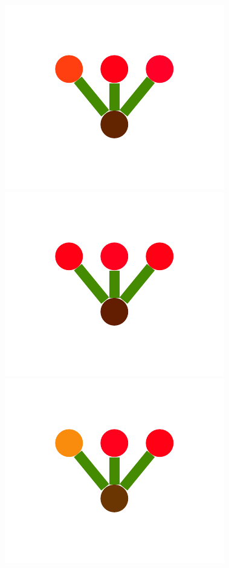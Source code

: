 \documentclass[a4paper,10pt]{article}
\begin{document}
\begin{figure}
{    \includegraphics[scale=.26]{../figures/vector/4-2-2-mergeprog-good-6.pdf}
    \includegraphics[scale=.26]{../figures/vector/4-2-2-mergeprog-good-7.pdf}
    \includegraphics[scale=.26]{../figures/vector/4-2-2-mergeprog-good-8.pdf}
    \label{fig:merge-good}    
    }
\end{figure}
\end{document}
